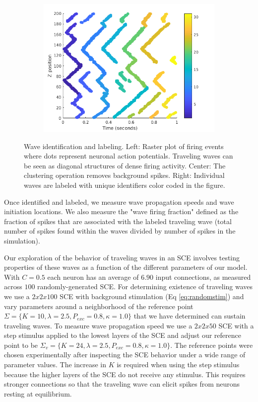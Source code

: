 \documentclass[12pt]{article}
\begin{document}
\begin{figure}[!htb]
\begin{subfigure}{0.33\textwidth}
  \includegraphics[width=\textwidth]{fig/2x2_wave_IDs}
 \end{subfigure}%
 \caption{Wave identification and labeling. Left: Raster plot of firing events where dots represent neuronal action potentials. 
          Traveling waves can be seen as diagonal structures of dense firing activity. 
          Center: The clustering operation removes background spikes. 
          Right: Individual waves are labeled with unique identifiers color coded in the figure.}
 \label{fig:wave_analysis}
\end{figure}
\FloatBarrier
Once identified and labeled, we measure wave propagation speeds and wave initiation locations. 
We also measure the "wave firing fraction" defined as the fraction of spikes that are associated with the labeled traveling wave (total number of spikes found within the waves divided by number of spikes in the simulation). 

Our exploration of the behavior of traveling waves in an SCE involves testing properties of these waves as a function of the different parameters of our model.
\color{red}With $C=0.5$ each neuron has an average of $6.90$ input connections, as measured across $100$ randomly-generated SCE\color{black}. 
For determining existence of traveling waves we use a \color{red}$2x2x100$ SCE\color{black} with background stimulation (Eq \ref{eq:randomstim}) and vary parameters around a neighborhood of the reference point $\Sigma = \{K=10,\lambda=2.5,P_{exc}=0.8,\kappa=1.0 \}$ that we have determined can sustain traveling waves.
\color{red}To measure wave propagation speed we use a $2x2x50$ SCE with\color{black} a step stimulus applied to the lowest layers of the SCE and adjust our reference point to be $\Sigma_v = \{K=24,\lambda=2.5,P_{exc}=0.8,\kappa=1.0 \}$.
\color{red}The reference points were chosen experimentally after inspecting the SCE behavior under a wide range of parameter values\color{black}.
The increase in $K$ is required when using the step stimulus because the higher layers of the SCE do not receive any stimulus.
This requires stronger connections so that the traveling wave can elicit spikes from neurons resting at equilibrium.
\FloatBarrier
\end{document}
